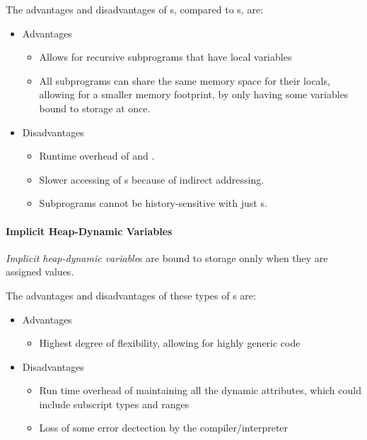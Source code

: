 The advantages and disadvantages of s, compared to s, are:
\begin{itemize}[noitemsep]
\item Advantages
  \begin{itemize}[noitemsep]
  \item Allows for recursive subprograms that have local variables
  \item All subprograms can share the same memory space for their locals, allowing for a smaller memory footprint, by only having some variables bound to storage at once.
  \end{itemize}
\item Disadvantages
  \begin{itemize}[noitemsep]
  \item Runtime overhead of  and .
  \item Slower accessing of s because of indirect addressing.
  \item Subprograms cannot be history-sensitive with just s.
  \end{itemize}
\end{itemize}

\paragraph{Implicit Heap-Dynamic Variables}\label{par:Implicit_Heap-Dynamic_Variable_Binding_Lifetime}
\begin{definition}\label{def:Implicit_Heap-Dynamic_Variable_Binding_Lifetime}
  \emph{Implicit heap-dynamic variable}s are bound to  storage onnly when they are assigned values.
\end{definition}

The advantages and disadvantages of these types of s are:
\begin{itemize}[noitemsep]
\item Advantages
  \begin{itemize}[noitemsep]
  \item Highest degree of flexibility, allowing for highly generic code
  \end{itemize}
\item Disadvantages
  \begin{itemize}[noitemsep]
  \item Run time overhead of maintaining all the dynamic attributes, which could include subscript types and ranges
  \item Loss of some error dectection by the compiler/interpreter
  \end{itemize}
\end{itemize}
